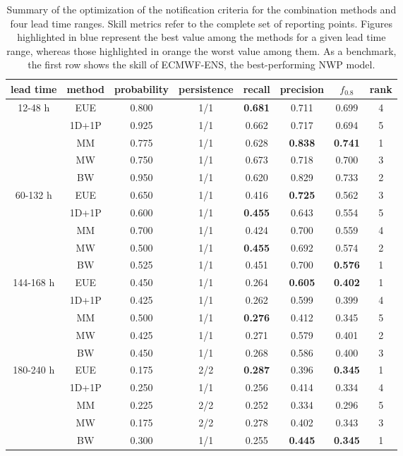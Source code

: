 \documentclass[preprint,12pt]{elsarticle}
\begin{document}
\begin{table}
    \centering
    \begin{tabular}{cccccccc}
        \hline
        lead time & method & probability & persistence & recall & precision & $f_{0.8}$ & rank \\
        \hline
        12-48 h & EUE & 0.800 & 1/1 & \textbf{0.681} & 0.711 & 0.699 & 4 \\
         & 1D+1P & 0.925 & 1/1 & 0.662 & 0.717 & 0.694 & 5 \\
         & MM & 0.775 & 1/1 & 0.628 & \textbf{0.838} & \textbf{0.741} & 1 \\
         & MW & 0.750 & 1/1 & 0.673 & 0.718 & 0.700 & 3 \\
         & BW & 0.950 & 1/1 & 0.620 & 0.829 & 0.733 & 2 \\
         \hline
        60-132 h & EUE & 0.650 & 1/1 & 0.416 & \textbf{0.725} & 0.562 & 3 \\
         & 1D+1P & 0.600 & 1/1 & \textbf{0.455} & 0.643 & 0.554 & 5 \\
         & MM & 0.700 & 1/1 & 0.424 & 0.700 & 0.559 & 4 \\
         & MW & 0.500 & 1/1 & \textbf{0.455} & 0.692 & 0.574 & 2 \\
         & BW & 0.525 & 1/1 & 0.451 & 0.700 & \textbf{0.576} & 1 \\
         \hline
        144-168 h & EUE & 0.450 & 1/1 & 0.264 & \textbf{0.605} & \textbf{0.402} & 1 \\
         & 1D+1P & 0.425 & 1/1 & 0.262 & 0.599 & 0.399 & 4 \\
         & MM & 0.500 & 1/1 & \textbf{0.276} & 0.412 & 0.345 & 5 \\
         & MW & 0.425 & 1/1 & 0.271 & 0.579 & 0.401 & 2 \\
         & BW & 0.450 & 1/1 & 0.268 & 0.586 & 0.400 & 3 \\
         \hline
        180-240 h & EUE & 0.175 & 2/2 & \textbf{0.287} & 0.396 & \textbf{0.345} & 1 \\
         & 1D+1P & 0.250 & 1/1 & 0.256 & 0.414 & 0.334 & 4 \\
         & MM & 0.225 & 2/2 & 0.252 & 0.334 & 0.296 & 5 \\
         & MW & 0.175 & 2/2 & 0.278 & 0.402 & 0.343 & 3 \\
         & BW & 0.300 & 1/1 & 0.255 & \textbf{0.445} & \textbf{0.345} & 1 \\
         \hline
    \end{tabular}
    \caption{Summary of the optimization of the notification criteria for the combination methods and four lead time ranges. Skill metrics refer to the complete set of reporting points. Figures highlighted in blue represent the best value among the methods for a given lead time range, whereas those highlighted in orange the worst value among them. As a benchmark, the first row shows the skill of ECMWF-ENS, the best-performing NWP model.}
    \label{tab:COMB_optimization}
\end{table}
\end{document}
